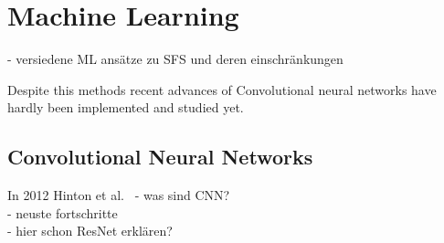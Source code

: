 \section{Machine Learning}
\label{sec:relwork:ML}	
	
- versiedene ML ansätze zu SFS und deren einschränkungen


	Despite this methods recent advances of Convolutional neural networks have hardly been implemented and studied yet. 
	
\subsection{Convolutional Neural Networks}
	In 2012 Hinton et al.~\cite{ImageNet_Deep_Convolutional_Neural_Networks}
\label{sec:relwork:CNN}
- was sind CNN? \\
- neuste fortschritte  \\
- hier schon ResNet erklären? 
	
